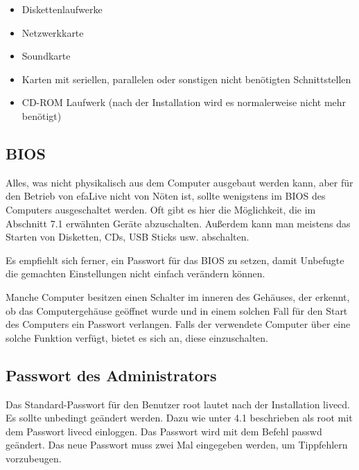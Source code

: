 \documentclass[a4paper,12pt,twoside]{article}
\begin{document}
\bigskip

\begin{itemize}
\item Diskettenlaufwerke
\item Netzwerkkarte
\item Soundkarte
\item Karten mit seriellen, parallelen oder sonstigen nicht benötigten
Schnittstellen
\item CD-ROM Laufwerk (nach der Installation wird es normalerweise nicht
mehr benötigt)
\end{itemize}

\bigskip

\subsection{BIOS}
Alles, was nicht physikalisch aus dem Computer ausgebaut werden kann,
aber für den Betrieb von efaLive nicht von Nöten ist, sollte wenigstens
im BIOS des Computers ausgeschaltet werden. Oft gibt es hier die
Möglichkeit, die im Abschnitt 7.1 erwähnten Geräte abzuschalten.
Außerdem kann man meistens das Starten von Disketten, CDs, USB Sticks
usw. abschalten.


\bigskip

Es empfiehlt sich ferner, ein Passwort für das BIOS zu setzen, damit
Unbefugte die gemachten Einstellungen nicht einfach verändern können.


\bigskip

Manche Computer besitzen einen Schalter im inneren des Gehäuses, der
erkennt, ob das Computergehäuse geöffnet wurde und in einem solchen
Fall für den Start des Computers ein Passwort verlangen. Falls der
verwendete Computer über eine solche Funktion verfügt, bietet es sich
an, diese einzuschalten.


\bigskip

\subsection{Passwort des Administrators}
Das Standard-Passwort für den Benutzer
{\textquotedbl}root{\textquotedbl} lautet nach der Installation
{\textquotedbl}livecd{\textquotedbl}. Es sollte unbedingt geändert
werden. Dazu wie unter 4.1 beschrieben als
{\textquotedbl}root{\textquotedbl} mit dem Passwort
{\textquotedbl}livecd{\textquotedbl} einloggen. Das Passwort wird mit
dem Befehl {\textquotedbl}passwd{\textquotedbl} geändert. Das neue
Passwort muss zwei Mal eingegeben werden, um Tippfehlern vorzubeugen. 
\end{document}
